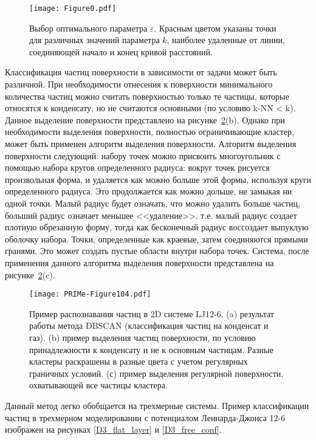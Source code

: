 \begin{figure}[!t]
    \centering
    \texttt{[image: Figure0.pdf]}
    \caption{Выбор оптимального параметра $\varepsilon$. Красным цветом указаны точки для различных значений параметра $k$, наиболее удаленные от линии, соединяющей начало и конец кривой расстояний.}
    \label{epsilon_k}
\end{figure}

Классификация частиц поверхности в зависимости от задачи может быть различной.
При необходимости отнесения к поверхности минимального количества частиц можно считать поверхностью только те частицы, которые относятся к конденсату, но не считаются основными (по условию k-NN < k).
Данное выделение поверхности представлено на рисунке~\ref{DBSCAN-Illustr}(b).
Однако при необходимости выделения поверхности, полностью ограничивающие кластер, может быть применен алгоритм выделения поверхности.
Алгоритм выделения поверхности следующий: набору точек можно присвоить многоугольник с помощью набора кругов определенного радиуса: вокруг точек рисуется произвольная форма, и удаляется как можно больше этой формы, используя круги определенного радиуса.
Это продолжается как можно дольше, не замыкая ни одной точки.
Малый радиус будет означать, что можно удалить больше частиц, больший радиус означает меньшее <<удаление>>, т.е. малый радиус создает плотную обрезанную форму, тогда как бесконечный радиус воссоздает выпуклую оболочку набора.
Точки, определенные как краевые, затем соединяются прямыми гранями.
Это может создать пустые области внутри набора точек.
Система, после применения данного алгоритма выделения поверхности представлена на рисунке~\ref{DBSCAN-Illustr}(c).

\begin{figure}[!t]
    \centering
    \texttt{[image: PRIMe-Figure104.pdf]}
    \caption{Пример распознавания частиц в 2D системе LJ12-6. (a) результат работы метода DBSCAN (классификация частиц на конденсат и газ). (b) пример выделения частиц поверхности, по условию принадлежности к конденсату и не к основным частицам. Разные кластеры раскрашены в разные цвета с учетом регулярных граничных условий. (с) пример выделения регулярной поверхности, охватывающей все частицы кластера.}
    \label{DBSCAN-Illustr}
\end{figure}

Данный метод легко обобщается на трехмерные системы. Пример классификации частиц в трехмерном моделировании с потенциалом Леннарда-Джонса 12-6 изображен на рисунках \ref{D3_flat_layer} и \ref{D3_free_conf}.

